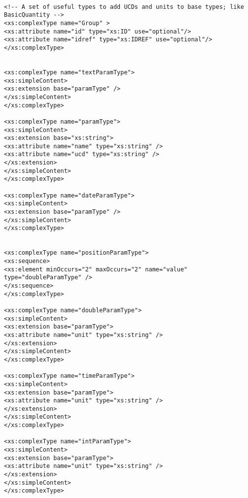 {\begin{flushleft}
\begin{fmppage}
\begin{verbatim}
\end{verbatim}
\end{fmppage}

\begin{fmppage}
\begin{verbatim}

<!-- A set of useful types to add UCDs and units to base types; like BasicQuantity -->
<xs:complexType name="Group" >
<xs:attribute name="id" type="xs:ID" use="optional"/>
<xs:attribute name="idref" type="xs:IDREF" use="optional"/>
</xs:complexType>


<xs:complexType name="textParamType">
<xs:simpleContent>
<xs:extension base="paramType" />
</xs:simpleContent>
</xs:complexType>

<xs:complexType name="paramType">
<xs:simpleContent>
<xs:extension base="xs:string">
<xs:attribute name="name" type="xs:string" />
<xs:attribute name="ucd" type="xs:string" />
</xs:extension>
</xs:simpleContent>
</xs:complexType>

<xs:complexType name="dateParamType">
<xs:simpleContent>
<xs:extension base="paramType" />
</xs:simpleContent>
</xs:complexType>


<xs:complexType name="positionParamType">
<xs:sequence>
<xs:element minOccurs="2" maxOccurs="2" name="value" type="doubleParamType" />
</xs:sequence>
</xs:complexType>

<xs:complexType name="doubleParamType">
<xs:simpleContent>
<xs:extension base="paramType">
<xs:attribute name="unit" type="xs:string" />
</xs:extension>
</xs:simpleContent>
</xs:complexType>

<xs:complexType name="timeParamType">
<xs:simpleContent>
<xs:extension base="paramType">
<xs:attribute name="unit" type="xs:string" />
</xs:extension>
</xs:simpleContent>
</xs:complexType>

<xs:complexType name="intParamType">
<xs:simpleContent>
<xs:extension base="paramType">
<xs:attribute name="unit" type="xs:string" />
</xs:extension>
</xs:simpleContent>
</xs:complexType>

\end{verbatim}
\end{fmppage}

\begin{fmppage}
\begin{verbatim}



\end{verbatim}
\end{fmppage}
\end{flushleft}}
